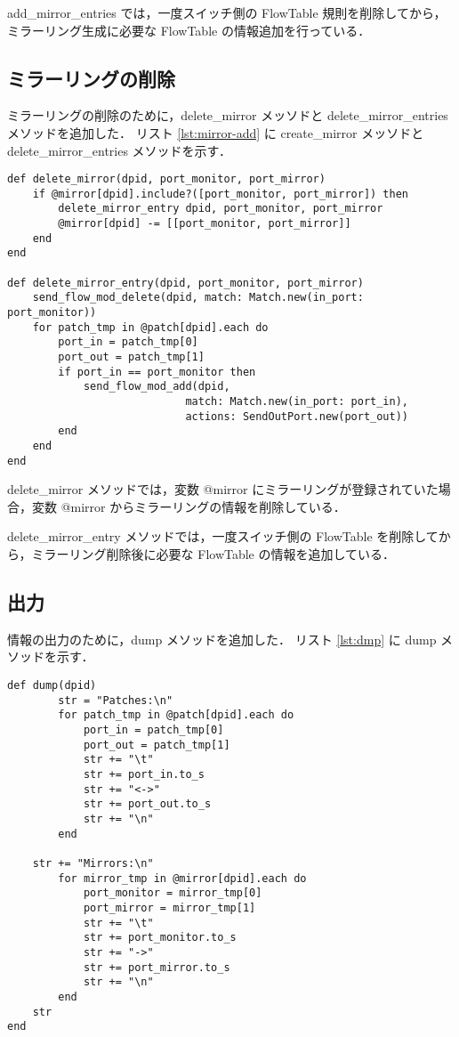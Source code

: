 ﻿\documentclass[10pt,a4paper,onecolumn]{jarticle}
\begin{document}
add\_mirror\_entries では，一度スイッチ側の FlowTable 規則を削除してから，ミラーリング生成に必要な FlowTable の情報追加を行っている．

\subsection{ミラーリングの削除}

ミラーリングの削除のために，delete\_mirror メッソドと delete\_mirror\_entries メソッドを追加した．
リスト \ref{lst:mirror-add} に create\_mirror メッソドと delete\_mirror\_entries メソッドを示す．

\begin{lstlisting}[caption = ミラーリング削除用のメソッド, label = lst:mirror-delete]
def delete_mirror(dpid, port_monitor, port_mirror)
	if @mirror[dpid].include?([port_monitor, port_mirror]) then
		delete_mirror_entry dpid, port_monitor, port_mirror
		@mirror[dpid] -= [[port_monitor, port_mirror]]
	end
end

def delete_mirror_entry(dpid, port_monitor, port_mirror)
	send_flow_mod_delete(dpid, match: Match.new(in_port: port_monitor))
	for patch_tmp in @patch[dpid].each do
		port_in = patch_tmp[0]
		port_out = patch_tmp[1]
		if port_in == port_monitor then
			send_flow_mod_add(dpid,
							match: Match.new(in_port: port_in),
							actions: SendOutPort.new(port_out))
		end
	end
end
\end{lstlisting}

delete\_mirror メソッドでは，変数 @mirror にミラーリングが登録されていた場合，変数 @mirror からミラーリングの情報を削除している．

delete\_mirror\_entry メソッドでは，一度スイッチ側の FlowTable を削除してから，ミラーリング削除後に必要な FlowTable の情報を追加している．

\subsection{出力}

情報の出力のために，dump メソッドを追加した．
リスト \ref{lst:dmp} に dump メソッドを示す．

\begin{lstlisting}[caption = dump, label = lst:dmp]
def dump(dpid)
    	str = "Patches:\n"
    	for patch_tmp in @patch[dpid].each do
      		port_in = patch_tmp[0]
      		port_out = patch_tmp[1]
      		str += "\t"
      		str += port_in.to_s
      		str += "<->"
      		str += port_out.to_s
      		str += "\n"
    	end
    
	str += "Mirrors:\n"
    	for mirror_tmp in @mirror[dpid].each do
      		port_monitor = mirror_tmp[0]
      		port_mirror = mirror_tmp[1]
      		str += "\t"
      		str += port_monitor.to_s
      		str += "->"
      		str += port_mirror.to_s
      		str += "\n"
    	end
	str
end
\end{lstlisting}
\end{document}
